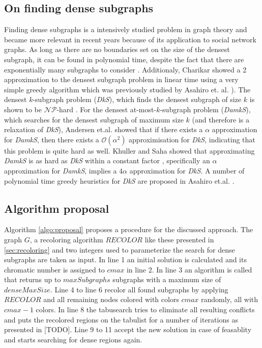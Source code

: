\subsection{On finding dense subgraphs}
Finding dense subgraphs is a intensively studied problem in graph theory and became more relevant in recent years because of its application to social network graphs. As long as there are no boundaries set on the size of the densest subgraph, it can be found in polynomial time, despite the fact that there are exponentially many subgraphs to consider \cite{lawler-76, asahiro-02}. Additionaly, Charikar \cite{charikar-00} showed a 2 approximation to the densest subgraph problem in linear time using a very simple greedy algorithm which was previously studied by Asahiro et. al. \cite{asahiroa-00}). The densest $k$-subgraph problem (\textit{DkS}), which finds the densest subgraph of size $k$ is shown to be $\mathcal{NP}$-hard \cite{feige-97,asahiro-02}. For the densest at-most-$k$-subgraph problem (\textit{DamkS}), which searches for the densest subgraph of maximum size $k$ (and therefore is a relaxation of \textit{DkS}), Andersen et.al. \cite{andersen-07} showed that if there exists a $\alpha$ approximation for \textit{DamkS}, then there exists a $\mathcal O(\alpha ^ 2)$ approximisation for \textit{DkS}, indicating that this problem is quite hard as well. Khuller and Saha showed that approximating \textit{DamkS} is as hard as \textit{DkS} within a constant factor \cite{khuller-09}, specifically an $\alpha$ approximation for \textit{DamkS}, implies a $4\alpha$ approximation for \textit{DkS}. A number of polynomial time greedy heuristics for \textit{DkS} are proposed in Asahiro et.al. \cite{asahiroa-00}.

\subsection{Algorithm proposal}
Algorithm \ref{algo:proposal} proposes a procedure for the discussed approach. The graph $G$, a recoloring algorithm $RECOLOR$ like these presented in \ref{sec:recoloring} and two integers used to parameterize the search for dense subgraphs are taken as input. In line 1 an initial solution is calculated and its chromatic number is assigned to $cmax$ in line 2. In line 3 an algorithm is called that returns up to $maxSubgraphs$ subgraphs with a maximum size of $denseMaxSize$. Line 4 to line 6 recolor all found subgraphs by applying $RECOLOR$ and all remaining nodes colored with colors $cmax$ randomly, all with $cmax-1$ colors. In line 8 the tabusearch tries to eliminate all resulting conflicts and puts the recolored regions on the tabulist for a number of iterations as presented in [TODO]. Line 9 to 11 accept the new solution in case of feasablity and starts searching for dense regions again.

